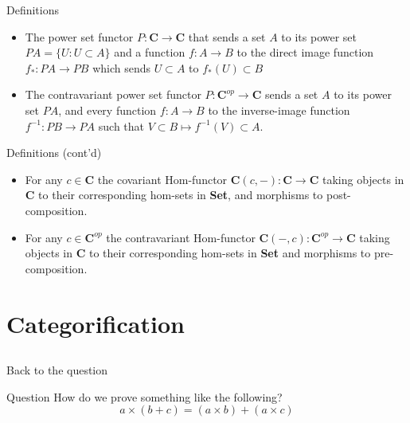 \documentclass[tikz]{beamer}
\theoremstyle{definition}
\begin{document}
\begin{frame}{Definitions}

\begin{itemize}
    \item The power set functor $P: \mathbf{C} \to \mathbf{C}$ that sends a set $A$ to its power set $PA = \{U : U \subset A\}$ and a function $f: A \to B$ to the direct image function $f_* : PA \to PB$ which sends $U \subset A$ to $f_*(U) \subset B$
    
    \item The contravariant power set functor $P: \mathbf{C}^{op} \to \mathbf{C}$ sends a set $A$ to its power set $PA$, and every function $f: A \to B$ to the inverse-image function $f^{-1}: PB \to PA$ such that $V \subset B \mapsto f^{-1}(V) \subset A$.
\end{itemize}{}
\end{frame}{}

\begin{frame}{Definitions (cont'd)}

\begin{itemize}
    \item For any $c \in \mathbf{C}$ the covariant Hom-functor $\mathbf{C}(c, -): \mathbf{C} \to \mathbf{C}$ taking objects in $\mathbf{C}$ to their corresponding hom-sets in \textbf{Set}, and morphisms to post-composition.
    \item For any $c \in \mathbf{C}^{op}$ the contravariant Hom-functor $\mathbf{C}(-, c): \mathbf{C}^{op} \to \mathbf{C}$ taking objects in $\mathbf{C}$ to their corresponding hom-sets in \textbf{Set} and morphisms to pre-composition. 
\end{itemize}{}
\end{frame}{}

\section{Categorification}
\subsection{}

\begin{frame}{Back to the question}

\begin{block}{Question}
How do we prove something like the following? 
\begin{equation*}
     a \times (b + c) = (a \times b) + (a \times c)
\end{equation*}
\end{block}
\end{frame}{}
\end{document}
